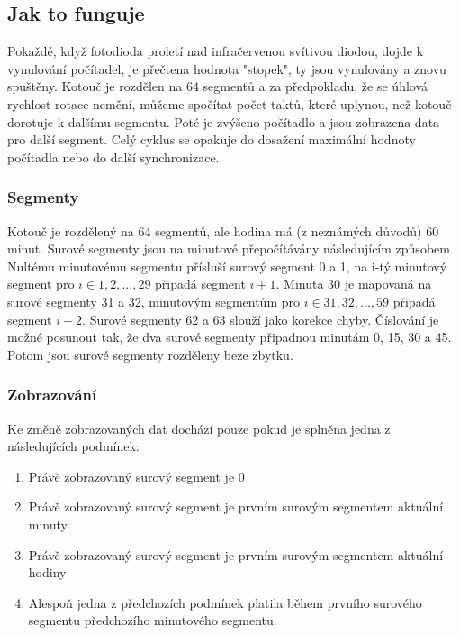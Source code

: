 \documentclass[10pt,a4paper]{article}
\begin{document}
\subsection*{Jak to funguje}
Pokaždé, když fotodioda proletí nad infračervenou svítivou diodou, dojde k vynulování počítadel, je přečtena hodnota "stopek", ty jsou vynulovány a znovu spuštěny. Kotouč je rozdělen na 64 segmentů a za předpokladu, že se úhlová rychlost rotace nemění, můžeme spočítat počet taktů, které uplynou, než kotouč dorotuje k dalšímu segmentu. Poté je zvýšeno počítadlo a jsou zobrazena data pro další segment. Celý cyklus se opakuje do dosažení maximální hodnoty počítadla nebo do další synchronizace.
\subsubsection*{Segmenty}
Kotouč je rozdělený na 64 segmentů, ale hodina má (z neznámých důvodů) 60 minut. Surové segmenty jsou na minutové přepočítávány následujícím způsobem. Nultému minutovému segmentu přísluší surový segment 0 a 1, na i-tý minutový segment pro \(i \in {1, 2, ..., 29} \) připadá segment \( i+1\). Minuta 30 je mapovaná na surové segmenty 31 a 32, minutovým segmentům pro \(i \in {31, 32, ..., 59} \) připadá segment \( i+2\). Surové segmenty 62 a 63 slouží jako korekce chyby. Číslování je možné posunout tak, že dva surové segmenty připadnou minutám 0, 15, 30 a 45. Potom jsou surové segmenty rozděleny beze zbytku.
\subsubsection*{Zobrazování}
Ke změně zobrazovaných dat dochází pouze pokud je splněna jedna z následujících podmínek:
\begin{enumerate}
\item Právě zobrazovaný surový segment je 0
\item Právě zobrazovaný surový segment je prvním surovým segmentem aktuální minuty
\item Právě zobrazovaný surový segment je prvním surovým segmentem aktuální hodiny
\item Alespoň jedna z předchozích podmínek platila během prvního surového segmentu předchozího minutového segmentu.
\end{enumerate}
\end{document}
